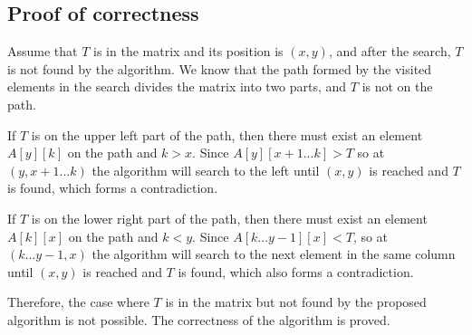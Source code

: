 \documentclass[paper=a4, fontsize=11pt]{scrartcl} %
\numberwithin{equation}{section} %
\numberwithin{figure}{section} %
\numberwithin{table}{section} %
\newcounter{claimcounter}
\numberwithin{claimcounter}{section}
\newenvironment{claim}{\stepcounter{claimcounter}{\textbf{Claim \theclaimcounter:}}}{}
\begin{document}
\subsection*{Proof of correctness}
Assume that $T$ is in the matrix and its position is $(x, y)$, and after the search, $T$ is not found by the
algorithm. We know that the path formed by the visited elements in the
search divides the matrix into two parts, and $T$ is not on the path. 

If $T$ is on the upper left part of the path, then there must exist an element
$A[y][k]$ on the path and $k > x$. Since $A[y][x+1...k] > T$ so at $(y, x+1...k)$ the algorithm
will search to the left until $(x, y)$ is reached and $T$ is found, which forms
a contradiction.

If $T$ is on the lower right part of the path, then there must exist an element 
$A[k][x]$ on the path and $k < y$. Since $A[k...y-1][x] < T$, so at $(k...y-1, x)$ 
the algorithm will search to the next element in the same column until 
$(x, y)$ is reached and $T$ is found, which also forms a contradiction.

Therefore, the case where $T$ is in the matrix but not found by the proposed
algorithm is not possible. The correctness of the algorithm is proved.


    

\end{document}
